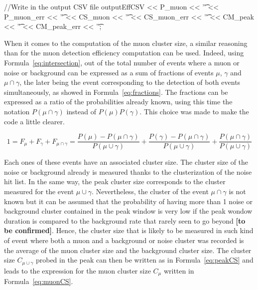 \begin{code}
\begin{cppcode}
{    //Write in the output CSV file
    outputEffCSV << P_muon << '\t' << P_muon_err << '\t'
                 << CS_muon << '\t' << CS_muon_err << '\t'
                 << CM_peak << '\t' << CM_peak_err << '\t';
}
	\end{cppcode}
	\label{cpp:effcorr}
	\vspace{5mm}
	\end{code}
	
	 When it comes to the computation of the muon cluster size, a similar reasoning than for the muon detection efficiency computation can be used. Indeed, using Formula~\ref{eq:intersection}, out of the total number of events where a muon or noise or background can be expressed as a sum of fractions of events $\mu$, $\gamma$ and $\mu\cap\gamma$, the later being the event corresponding to the detection of both events simultaneously, as showed in Formula~\ref{eq:fractions}. The fractions can be expressed as a ratio of the probabilities already known, using this time the notation $P(\mu\cap\gamma)$ instead of $P(\mu)P(\gamma)$. This choice was made to make the code a little clearer.
	
	\begin{equation}
	\label{eq:fractions}
	1 = F_{\mu} + F_{\gamma} + F_{\mu\cap\gamma} = \frac{P(\mu)-P(\mu\cap\gamma)}{P(\mu\cup\gamma)} + \frac{P(\gamma)-P(\mu\cap\gamma)}{P(\mu\cup\gamma)} + \frac{P(\mu\cap\gamma)}{P(\mu\cup\gamma)}
	\end{equation}
	
	Each ones of these events have an associated cluster size. The cluster size of the noise or background already is measured thanks to the clusterization of the noise hit list. In the same way, the peak cluster size corresponds to the cluster measured for the event $\mu\cup\gamma$. Nevertheless, the cluster of the event $\mu\cap\gamma$ is not known but it can be assumed that the probability of having more than 1 noise or background cluster contained in the peak window is very low if the peak wondow duration is compared to the background rate that rarely seen to go beyond  \textbf{[to be confirmed]}. Hence, the cluster size that is likely to be measured in such kind of event where both a muon and a background or noise cluster was recorded is the average of the muon cluster size and the background cluster size. The cluster size $C_{\mu\cup\gamma}$ probed in the peak can then be written as in Formula~\ref{eq:peakCS} and leads to the expression for the muon cluster size $C_{\mu}$ written in Formula~\ref{eq:muonCS}.
	
